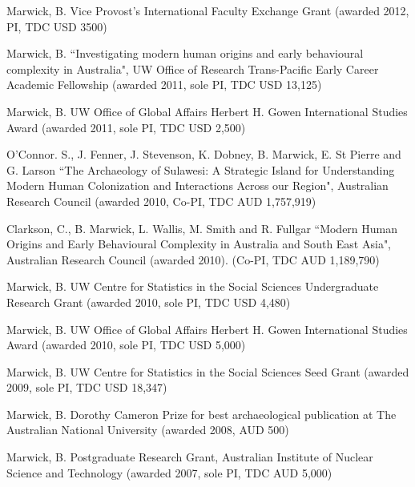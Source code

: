 \ind Marwick, B. Vice Provost’s International Faculty Exchange Grant (awarded 2012, PI, TDC USD 3500)

\ind  Marwick, B. ``Investigating modern human origins and early behavioural complexity in Australia", UW Office of Research Trans-Pacific Early Career Academic Fellowship (awarded 2011, sole PI, TDC USD 13,125)

\ind Marwick, B. UW Office of Global Affairs Herbert H. Gowen International Studies Award (awarded 2011, sole PI, TDC USD 2,500)

\ind O’Connor. S., J. Fenner, J. Stevenson, K. Dobney, B. Marwick, E. St Pierre and G. Larson ``The Archaeology of Sulawesi: A Strategic Island for Understanding Modern Human Colonization and Interactions Across our Region", Australian Research Council (awarded 2010, Co-PI, TDC AUD 1,757,919)

\ind Clarkson, C., B. Marwick, L. Wallis, M. Smith and R. Fullgar  ``Modern Human Origins and Early Behavioural Complexity in Australia and South East Asia", Australian Research Council (awarded 2010). (Co-PI, TDC AUD 1,189,790)

\ind Marwick, B. UW Centre for Statistics in the Social Sciences Undergraduate Research Grant (awarded 2010, sole PI, TDC USD 4,480)

\ind Marwick, B. UW Office of Global Affairs Herbert H. Gowen International Studies Award (awarded 2010, sole  PI, TDC USD 5,000)

\ind Marwick, B. UW Centre for Statistics in the Social Sciences Seed Grant (awarded 2009, sole PI, TDC USD 18,347)

\ind Marwick, B. Dorothy Cameron Prize for best archaeological publication at The Australian National University (awarded 2008, AUD 500)

\ind Marwick, B. Postgraduate Research Grant, Australian Institute of Nuclear Science and Technology (awarded 2007, sole PI, TDC AUD 5,000)
